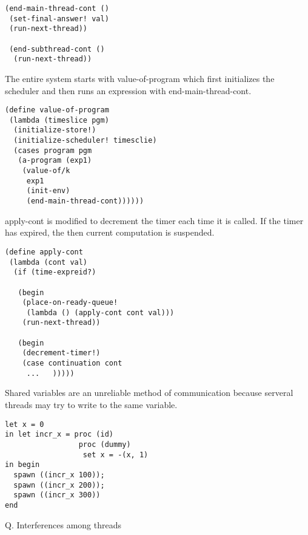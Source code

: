 \documentclass{article}
\begin{document}
\begin{huge}
\begin{lstlisting}
(end-main-thread-cont ()
 (set-final-answer! val)
 (run-next-thread))
 
 (end-subthread-cont ()
  (run-next-thread))
\end{lstlisting}

The entire system starts with value-of-program which first initializes the scheduler and then runs an expression with end-main-thread-cont.

\begin{lstlisting}
(define value-of-program
 (lambda (timeslice pgm)
  (initialize-store!)
  (initialize-scheduler! timesclie)
  (cases program pgm
   (a-program (exp1)
    (value-of/k 
     exp1
     (init-env)
     (end-main-thread-cont))))))
\end{lstlisting}


apply-cont is modified to decrement the timer each time it is called. 
If the timer has expired, the then current computation is suspended.

\begin{lstlisting}
(define apply-cont
 (lambda (cont val)
  (if (time-expreid?)
  
   (begin
    (place-on-ready-queue!
     (lambda () (apply-cont cont val)))
    (run-next-thread))
    
   (begin
    (decrement-timer!)
    (case continuation cont
     ...   )))))
\end{lstlisting}


Shared variables are an unreliable method of communication because serveral threads may try to write to the same variable.

\begin{lstlisting}
let x = 0
in let incr_x = proc (id)
                 proc (dummy)
                  set x = -(x, 1)
in begin
  spawn ((incr_x 100));
  spawn ((incr_x 200));
  spawn ((incr_x 300))
end             
\end{lstlisting}

Q. Interferences among threads



\end{huge}
\end{document}
